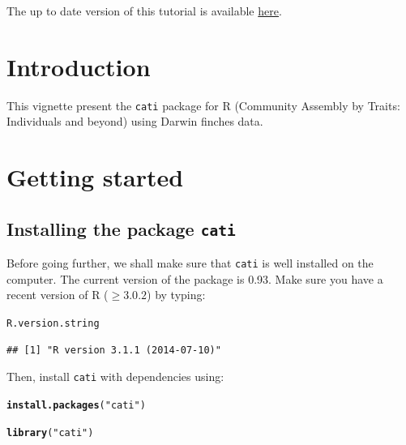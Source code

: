 \documentclass[12pt]{article}\usepackage[]{graphicx}\usepackage[]{color}
\makeatletter
\newcommand{\hlstr}[1]{\textcolor[rgb]{0.192,0.494,0.8}{#1}}%
\newcommand{\hlstd}[1]{\textcolor[rgb]{0.345,0.345,0.345}{#1}}%
\newcommand{\hlkwd}[1]{\textcolor[rgb]{0.737,0.353,0.396}{\textbf{#1}}}%
\newenvironment{kframe}{%
 \def\at@end@of@kframe{}%
 \ifinner\ifhmode%
  \def\at@end@of@kframe{\end{minipage}}%
  \begin{minipage}{\columnwidth}%
 \fi\fi%
 \def\FrameCommand##1{\hskip\@totalleftmargin \hskip-\fboxsep
 \colorbox{shadecolor}{##1}\hskip-\fboxsep
     \hskip-\linewidth \hskip-\@totalleftmargin \hskip\columnwidth}%
 \MakeFramed {\advance\hsize-\width
   \@totalleftmargin\z@ \linewidth\hsize
   \@setminipage}}%
 {\par\unskip\endMakeFramed%
 \at@end@of@kframe}
\newenvironment{knitrout}{}{} %
\makeatother
\begin{document}
\hfill
The up to date version of this tutorial is available \href{http://sourceforge.net/p/cati-r/code/ci/master/tree/tutorial/vignettes/vignette.pdf}{here}.

\newpage
\tableofcontents

\newpage


\section{Introduction}
This vignette present the \texttt{cati} package for R (Community Assembly by Traits: Individuals and beyond) using Darwin finches data.

\section{Getting started}
\subsection{Installing the package \texttt{cati}}

Before going further, we shall make sure that \texttt{cati} is well installed
on the computer.
The current version of the package is 0.93.
Make sure you have a recent version of R ($\geq 3.0.2$) by typing:

\begin{knitrout}
\color{fgcolor}\begin{kframe}
\begin{alltt}
\hlstd{R.version.string}
\end{alltt}
\begin{verbatim}
## [1] "R version 3.1.1 (2014-07-10)"
\end{verbatim}
\end{kframe}
\end{knitrout}

Then, install \texttt{cati} with dependencies using:
\begin{knitrout}
\color{fgcolor}\begin{kframe}
\begin{alltt}
\hlkwd{install.packages}\hlstd{(}\hlstr{"cati"}\hlstd{)}
\end{alltt}


{\ttfamily\noindent\itshape\color{messagecolor}{\#\# Installing package into 'C:/Users/taudiere/Documents/R/win-library/3.1'\\\#\# (as 'lib' is unspecified)}}

{\ttfamily\noindent\bfseries\color{errorcolor}{\#\# Error: trying to use CRAN without setting a mirror}}\begin{alltt}
\hlkwd{library}\hlstd{(}\hlstr{"cati"}\hlstd{)}
\end{alltt}


{\ttfamily\noindent\itshape\color{messagecolor}{\#\# Loading required package: nlme\\\#\# Loading required package: ade4\\\#\# Loading required package: ape}}\end{kframe}
\end{knitrout}
\end{document}
